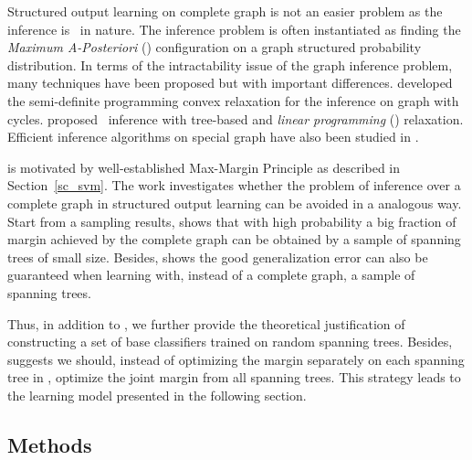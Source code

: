 {Structured output learning on complete graph is not an easier problem as the inference is \nphard\ in nature.
The inference problem is often instantiated as finding the \textit{Maximum A-Posteriori} (\map) configuration on a graph structured probability distribution.
In terms of the intractability issue of the graph inference problem, many techniques have been proposed but with important differences.
\citet{Jordan04semiefinite} developed the semi-definite programming convex relaxation for the inference on graph with cycles.
\citet{Wainwright05map} proposed \map\ inference with tree-based and \textit{linear programming} (\lp) relaxation.
Efficient inference algorithms on special graph have also been studied in \citep{Globerson07approximate}.

 is motivated by well-established Max-Margin Principle as described in Section~\ref{sc_svm}.
The work investigates whether the problem of inference over a complete graph in structured output learning can be avoided in a analogous way.
Start from a sampling results,  shows that with high probability a big fraction of margin achieved by the complete graph can be obtained by a sample of spanning trees of small size.
Besides,  shows the good generalization error can also be guaranteed when learning with, instead of a complete graph, a sample of spanning trees.

Thus, in addition to , we further provide the theoretical justification of constructing a set of base classifiers trained on random spanning trees. 
Besides,  suggests we should, instead of optimizing the margin separately on each spanning tree in \mam, optimize the joint margin from all spanning trees.
This strategy leads to the learning model presented in the following section.

\subsection{Methods}

}
